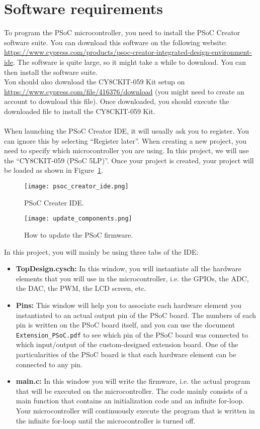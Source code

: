 \section{Software requirements}

To program the PSoC microcontroller, you need to install the PSoC Creator software suite. You can download this software on the following website: \\
\url{https://www.cypress.com/products/psoc-creator-integrated-design-environment-ide}. The software is quite large, so it might take a while to download. You can then install the software suite. \\
You should also download the CY8CKIT-059 Kit setup on \url{https://www.cypress.com/file/416376/download} (you might need to create an account to download this file). Once downloaded, you should execute the downloaded file to install the CY8CKIT-059 Kit. 
\\
\\
When launching the PSoC Creator IDE, it will usually ask you to register. You can ignore this by selecting ``Register later''. When creating a new project, you need to specify which microcontroller you are using. In this project, we will use the ``CY8CKIT-059 (PSoC 5LP)''. Once your project is created, your project will be loaded as shown in Figure~\ref{fig:psoc_creator_ide}. 
\begin{figure}[h]
	\centering
	\texttt{[image: psoc\_creator\_ide.png]}
	\caption{PSoC Creater IDE. }
	\label{fig:psoc_creator_ide}
\end{figure}
\begin{figure}[h]
	\centering
	\texttt{[image: update\_components.png]}
	\caption{How to update the PSoC firmware. }
	\label{fig:update_components}
\end{figure}

In this project, you will mainly be using three tabs of the IDE: 
\begin{itemize}
	\item \textbf{TopDesign.cysch: } In this window, you will instantiate all the hardware elements that you will use in the microcontroller, i.e. the GPIOs, the ADC, the DAC, the PWM, the LCD screen, etc. 
	\item \textbf{Pins: } This window will help you to associate each hardware element you instantiated to an actual output pin of the PSoC board. The numbers of each pin is written on the PSoC board itself, and you can use the document \texttt{Extension\_PSoC.pdf} to see which pin of the PSoC board was connected to which input/output of the custom-designed extension board. One of the particularities of the PSoC board is that each hardware element can be connected to any pin. 
	\item \textbf{main.c: } In this window you will write the firmware, i.e. the actual program that will be executed on the microcontroller. The code mainly consists of a main function that contains an initialization code and an infinite for-loop. Your microcontroller will continuously execute the program that is written in the infinite for-loop until the microcontroller is turned off.  
\end{itemize}

